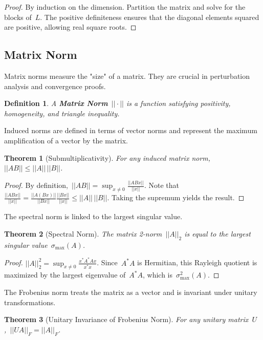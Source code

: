 \documentclass[12pt]{article}
\newtheorem{theorem}{Theorem}[section]
\newtheorem{definition}{Definition}[section]
\begin{document}
\begin{proof}
    By induction on the dimension. Partition the matrix and solve for the blocks of~$L$. The positive definiteness ensures that the diagonal elements squared are positive, allowing real square roots.
\end{proof}

\subsection{Matrix Norm}

Matrix norms measure the "size" of a matrix. They are crucial in perturbation analysis and convergence proofs.

\begin{definition}
    A \textbf{Matrix Norm}~$||\cdot||$ is a function satisfying positivity, homogeneity, and triangle inequality.
\end{definition}

Induced norms are defined in terms of vector norms and represent the maximum amplification of a vector by the matrix.

\begin{theorem}[Submultiplicativity]
    For any induced matrix norm,~$||AB|| \le ||A|| \, ||B||$.
\end{theorem}

\begin{proof}
    By definition,~$||AB|| = \sup_{x \neq 0} \frac{||ABx||}{||x||}$. Note that~$\frac{||ABx||}{||x||} = \frac{||A(Bx)||}{||Bx||} \frac{||Bx||}{||x||} \le ||A|| \, ||B||$. Taking the supremum yields the result.
\end{proof}

The spectral norm is linked to the largest singular value.

\begin{theorem}[Spectral Norm]
    The matrix 2-norm~$||A||_2$ is equal to the largest singular value~$\sigma_{\max}(A)$.
\end{theorem}

\begin{proof}
    $||A||_2^2 = \sup_{x \neq 0} \frac{x^* A^* A x}{x^* x}$. Since~$A^* A$ is Hermitian, this Rayleigh quotient is maximized by the largest eigenvalue of~$A^* A$, which is~$\sigma_{\max}^2(A)$.
\end{proof}

The Frobenius norm treats the matrix as a vector and is invariant under unitary transformations.

\begin{theorem}[Unitary Invariance of Frobenius Norm]
    For any unitary matrix~$U$,~$||UA||_F = ||A||_F$.
\end{theorem}
\end{document}
